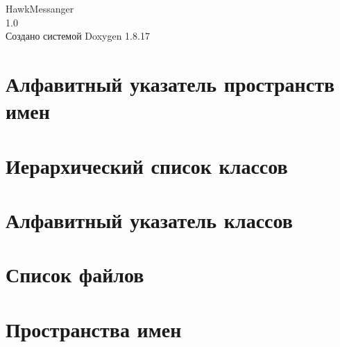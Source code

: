 \let\mypdfximage\pdfximage\def\pdfximage{\immediate\mypdfximage}\documentclass[twoside]{book}
\newcommand{\+}{\discretionary{\mbox{\scriptsize$\hookleftarrow$}}{}{}}
\newcommand{\clearemptydoublepage}{%
  \newpage{\pagestyle{empty}\cleardoublepage}%
}
\begin{document}
\hypersetup{pageanchor=false,
             bookmarksnumbered=true,
             pdfencoding=unicode
            }
\begin{titlepage}
\vspace*{7cm}
\begin{center}%
{\Large Hawk\+Messanger \\[1ex]\large 1.\+0 }\\
\vspace*{1cm}
{\large Создано системой Doxygen 1.8.17}\\
\end{center}
\end{titlepage}
\clearemptydoublepage
{}
\tableofcontents
\clearemptydoublepage
{}
\hypersetup{pageanchor=true}

\chapter{Алфавитный указатель пространств имен}

\chapter{Иерархический список классов}

\chapter{Алфавитный указатель классов}

\chapter{Список файлов}

\chapter{Пространства имен}







\end{document}
